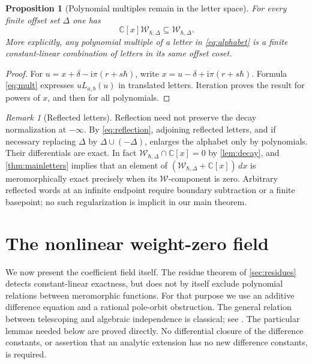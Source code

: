 \documentclass[11pt]{article}
\numberwithin{equation}{section}
\newtheorem{proposition}[proposition]{Proposition}
\theoremstyle{definition}
\theoremstyle{remark}
\newtheorem{remark}[remark]{Remark}
\newcommand{\C}{\mathbb C}
\newcommand{\dd}{\,d}
\newcommand{\ii}{\mathrm i}
\newcommand{\calW}{\mathcal W}
\newcommand{\qh}{\hbar}
\begin{document}
\begin{proposition}[Polynomial multiples remain in the letter space]\label{prop:polyclosure}
For every finite offset set $\Delta$ one has
\begin{equation}\label{eq:polyclosure}
 \C[x]\calW_{\qh,\Delta}\subseteq\calW_{\qh,\Delta}.
\end{equation}
More explicitly, any polynomial multiple of a letter in
\eqref{eq:alphabet} is a finite constant-linear combination of letters in
its same offset coset.
\end{proposition}
\begin{proof}
For $u=x+\delta-\ii\pi(r+s\qh)$, write $x=u-\delta+\ii\pi(r+s\qh)$.
Formula \eqref{eq:mult} expresses $uL_{a,b}(u)$ in translated letters.
Iteration proves the result for powers of $x$, and then for all polynomials.
\end{proof}

\begin{remark}[Reflected letters]
Reflection need not preserve the decay normalization at $-\infty$.
By \eqref{eq:reflection}, adjoining reflected letters, and if necessary
replacing $\Delta$ by $\Delta\cup(-\Delta)$, enlarges the alphabet only by
polynomials. Their differentials are exact. In fact
$\calW_{\qh,\Delta}\cap\C[x]=0$ by \cref{lem:decay}, and
\cref{thm:mainletters} implies that an element of
$(\calW_{\qh,\Delta}+\C[x])\dd x$ is meromorphically exact precisely when
its $\calW$-component is zero. Arbitrary reflected words at an infinite
endpoint require boundary subtraction or a finite basepoint; no such
regularization is implicit in our main theorem.
\end{remark}

\section{The nonlinear weight-zero field}\label{sec:coefficients}

We now present the coefficient field itself. The residue theorem of
\cref{sec:residues} detects constant-linear exactness, but does not by itself
exclude polynomial relations between meromorphic functions. For that purpose
we use an additive difference equation and a rational pole-orbit obstruction.
The general relation between telescoping and algebraic independence is
classical; see \cite{Schneider2010,HardouinSinger2008}. The particular lemmas
needed below are proved directly. No differential closure of the difference
constants, or assertion that an analytic extension has no new difference
constants, is required.
\end{document}
